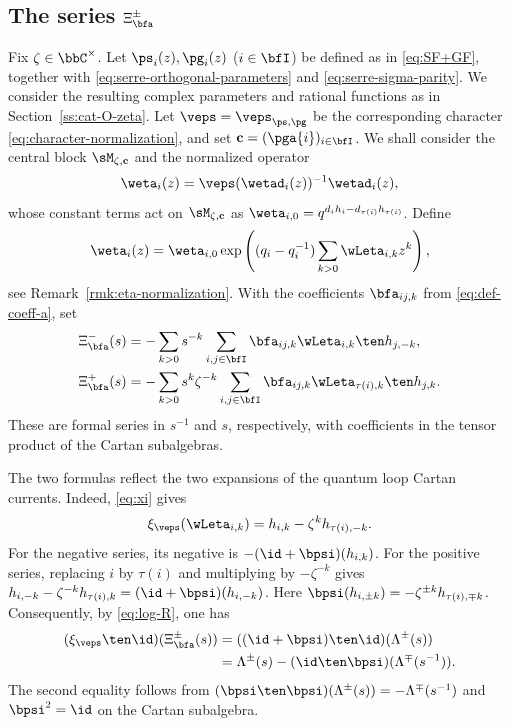 \documentclass[reqno]{amsart}
\numberwithin{equation}{section}
\begin{document}
\subsection{The series $\Xi_{\bfa}^\pm$}\label{eq:operator-Xi}
Fix $\zeta\in\bbC^\times$. Let $\ps_i(z),\pg_i(z)$ ($i\in\bfI$) be 
defined as in \eqref{eq:SF+GF}, together with
\eqref{eq:serre-orthogonal-parameters} and \eqref{eq:serre-sigma-parity}. 
We consider the resulting complex parameters and rational functions as in Section~\ref{ss:cat-O-zeta}.
Let $\veps=\veps_{\ps,\pg}$ be the
corresponding character \eqref{eq:character-normalization}, and set
$\mathbf c=(\pga{i})_{i\in\bfI}$. We shall consider the central block
$\sM_{\zeta,\mathbf c}$ and the normalized operator
\begin{equation}\label{eq:eta-normalization}
\weta_i(z)=\veps(\wetad_i(z))^{-1}\wetad_i(z),
\end{equation}
whose constant terms act on $\sM_{\zeta,\mathbf c}$ as
$\weta_{i,0}=q^{d_ih_i-d_{\tau(i)}h_{\tau(i)}}$. Define
\begin{equation}\label{eq:tensor-normalized-logarithms}
\weta_i(z)=\weta_{i,0}
\exp\left((q_i-q_i^{-1})\sum_{k>0}\wLeta_{i,k}z^k\right),
\end{equation}
see Remark~\ref{rmk:eta-normalization}. With the coefficients
$\bfa_{ij,k}$ from \eqref{eq:def-coeff-a}, set
\begin{equation}\label{eq:tK0-Xi-a}
\begin{aligned}
\Xi_{\bfa}^-(s)
&=-\sum_{k>0}s^{-k}\sum_{i,j\in\bfI}
\bfa_{ij,k}\wLeta_{i,k}\ten h_{j,-k},\\
\Xi_{\bfa}^+(s)
&=-\sum_{k>0}s^k\zeta^{-k}\sum_{i,j\in\bfI}
\bfa_{ij,k}\wLeta_{\tau(i),k}\ten h_{j,k}.
\end{aligned}
\end{equation}
These are formal series in $s^{-1}$ and $s$, respectively, with
coefficients in the tensor product of the Cartan subalgebras.

The two formulas reflect the two expansions of the quantum loop
Cartan currents. Indeed, \eqref{eq:xi} gives
\begin{equation}\label{eq:tensor-logarithm-realization}
\xi_\veps(\wLeta_{i,k})=h_{i,k}-\zeta^k h_{\tau(i),-k}.
\end{equation}
For the negative series, its negative is
$-(\id+\bpsi)(h_{i,k})$. For the positive series, replacing $i$ by
$\tau(i)$ and multiplying by $-\zeta^{-k}$ gives
$h_{i,-k}-\zeta^{-k}h_{\tau(i),k}=(\id+\bpsi)(h_{i,-k})$.
Here $\bpsi(h_{i,\pm k})=-\zeta^{\pm k}h_{\tau(i),\mp k}$.
Consequently, by \eqref{eq:log-R}, one has
\begin{equation}\label{eq:Xi-Lambda}
\begin{aligned}
(\xi_\veps\ten\id)(\Xi^\pm_{\bfa}(s))
&=((\id+\bpsi)\ten\id)(\Lambda^\pm(s))\\
&=\Lambda^\pm(s)-(\id\ten\bpsi)(\Lambda^\mp(s^{-1})).
\end{aligned}
\end{equation}
The second equality follows from
$(\bpsi\ten\bpsi)(\Lambda^\pm(s))=-\Lambda^\mp(s^{-1})$
and $\bpsi^2=\id$ on the Cartan subalgebra.
\end{document}
